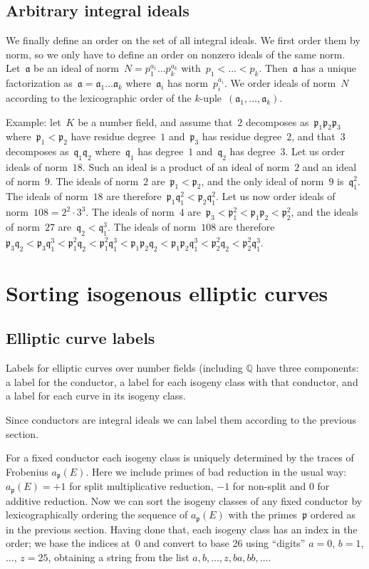 \documentclass{article}
\def\Q{{\mathbb Q}}
\def\a{{\mathfrak a}}
\def\p{{\mathfrak p}}
\def\q{{\mathfrak q}}
\begin{document}
\subsection{Arbitrary integral ideals}

We finally define an order on the set of all integral ideals. We first order
them by norm, so we only have to define an order on nonzero ideals of the same
norm. Let~$\a$ be an ideal of norm~$N = p_1^{a_1}\dots p_k^{a_k}$ with~$p_1 <
\dots < p_k$. Then~$\a$ has a unique factorization as~$\a = \a_1\dots\a_k$
where~$\a_i$ has norm~$p_i^{a_i}$. We order ideals of norm~$N$ according to the
lexicographic order of the $k$-uple~$(\a_1,\dots,\a_k)$.

Example: let~$K$ be a number field, and assume that~$2$ decomposes
as~$\p_1\p_2\p_3$ where~$\p_1<\p_2$ have residue degree~$1$ and~$\p_3$ has
residue degree~$2$, and that~$3$ decomposes as~$\q_1\q_2$ where~$\q_1$ has
degree~$1$ and~$\q_2$ has degree~$3$. Let us order ideals of norm~$18$. Such an
ideal is a product of an ideal of norm~$2$ and an ideal of norm~$9$. The ideals
of norm~$2$ are~$\p_1 < \p_2$, and the only ideal of norm~$9$ is~$\q_1^2$. The
ideals of norm~$18$ are therefore~$\p_1\q_1^2 < \p_2\q_1^2$. Let us now order ideals
of norm~$108 = 2^2\cdot 3^3$. The ideals of norm~$4$ are~$\p_3 < \p_1^2 < \p_1\p_2 <
\p_2^2$, and the ideals of norm~$27$ are~$\q_2 < \q_1^3$. The ideals of
norm~$108$ are therefore~$\p_3\q_2 < \p_3\q_1^3 < \p_1^2\q_2 < \p_1^2\q_1^3 <
\p_1\p_2\q_2 < \p_1\p_2\q_1^3 < \p_2^2\q_2 < \p_2^2\q_1^3$.

\section{Sorting isogenous elliptic curves}

\subsection{Elliptic curve labels}

Labels for elliptic curves over number fields (including $\Q$ have
three components: a label for the conductor, a label for each isogeny
class with that conductor, and a label for each curve in its isogeny
class.

Since conductors are integral ideals we can label them according to
the previous section.

For a fixed conductor each isogeny class is uniquely determined by the
traces of Frobenius $a_{\p}(E)$.  Here we include primes of bad
reduction in the usual way: $a_{\p}(E)=+1$ for split multiplicative
reduction, $-1$ for non-split and $0$ for additive reduction.  Now we
can sort the isogeny classes of any fixed conductor by
lexicographically ordering the sequence of $a_{\p}(E)$ with the
primes~$\p$ ordered as in the previous section.  Having done that,
each isogeny class has an index in the order; we base the indices
at~$0$ and convert to base 26 using ``digits'' $a=0$, $b=1$, $\dots$,
$z=25$, obtaining a string from the list $a, b, \dots, z, ba, bb,
\dots$.
\end{document}
